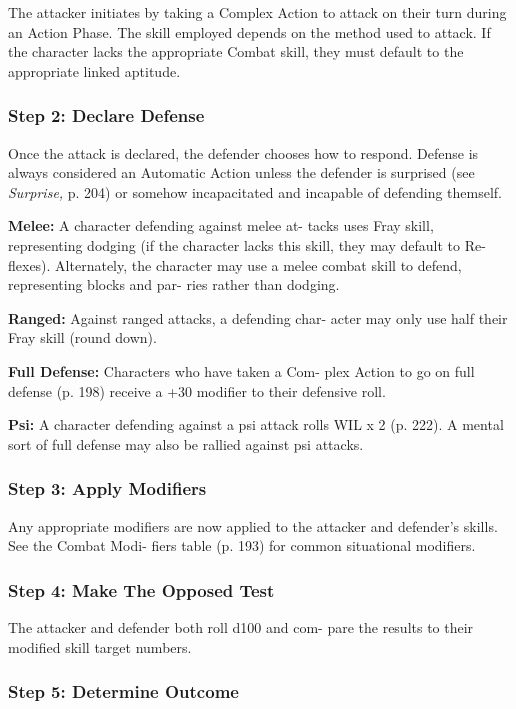 The attacker initiates by taking a Complex Action to 
attack on their turn during an Action Phase. The skill 
employed depends on the method used to attack. If 
the character lacks the appropriate Combat skill, they 
must default to the appropriate linked aptitude.

\subsubsection{Step 2: Declare Defense}

Once the attack is declared, the defender chooses how 
to respond. Defense is always considered an Automatic 
Action unless the defender is surprised (see \textit{Surprise,}
p. 204) or somehow incapacitated and incapable of 
defending themself.

\textbf{Melee:} A character defending against melee at-
tacks uses Fray skill, representing dodging (if the 
character lacks this skill, they may default to Re-
flexes). Alternately, the character may use a melee 
combat skill to defend, representing blocks and par-
ries rather than dodging.

\textbf{Ranged: }Against ranged attacks, a defending char-
acter may only use half their Fray skill (round down).

\textbf{Full Defense:} Characters who have taken a Com-
plex Action to go on full defense (p. 198) receive a 
+30 modifier to their defensive roll.

\textbf{Psi: }A character defending against a psi attack rolls 
WIL x 2 (p. 222). A mental sort of full defense may 
also be rallied against psi attacks.

\subsubsection{Step 3: Apply Modifiers}

Any appropriate modifiers are now applied to the 
attacker and defender's skills. See the Combat Modi-
fiers table (p. 193) for common situational modifiers.

\subsubsection{Step 4: Make The Opposed Test}

The attacker and defender both roll d100 and com-
pare the results to their modified skill target numbers.

\subsubsection{Step 5: Determine Outcome}

